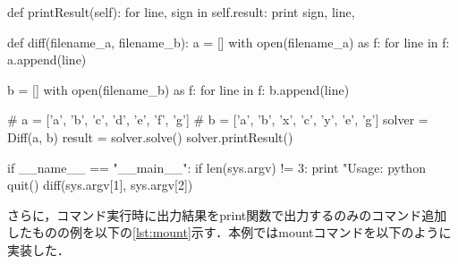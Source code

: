 \begin{mylisting}[label={lst:diff},language=sh,caption=diffコマンド]
  def printResult(self):
    for line, sign in self.result:
      print sign, line,

def diff(filename_a, filename_b):
  a = []
  with open(filename_a) as f:
    for line in f:
      a.append(line)

  b = []
  with open(filename_b) as f:
    for line in f:
      b.append(line)

  # a = ['a', 'b', 'c', 'd', 'e', 'f', 'g']
  # b = ['a', 'b', 'x', 'c', 'y', 'e', 'g']
  solver = Diff(a, b)
  result = solver.solve()
  solver.printResult()

if __name__ == "__main__":
  if len(sys.argv) != 3:
    print "Usage: python %
    quit()
  diff(sys.argv[1], sys.argv[2])
\end{mylisting}

さらに，コマンド実行時に出力結果をprint関数で出力するのみのコマンド追加したものの例を以下の\ref{lst:mount}示す．本例ではmountコマンドを以下のように実装した．

